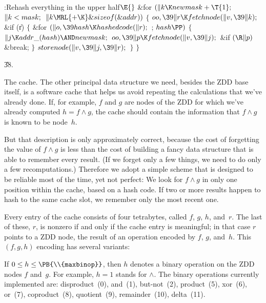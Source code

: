 \Y\B\4:Rehash everything in the upper half\X${}\E{}$\6
\&{for} ${}(\|k\K\\{newmask}+\T{1};{}$ ${}\|k<\\{mask};{}$ ${}\|k\MRL{+{\K}}%
\&{sizeof}(\&{addr})){}$\5
${}\{{}$\1\6
${}\\{oo},\39\|r\K\\{fetchnode}(\|v,\39\|k);{}$\6
\&{if} (\|r)\5
${}\{{}$\1\6
\&{for} ${}(\|o,\39\\{hash}\K\\{hashedcode}(\|r);{}$  ; ${}\\{hash}\PP){}$\5
${}\{{}$\1\6
${}\|j\K\\{addr\_}(\\{hash})\AND\\{newmask};{}$\6
${}\\{oo},\39\|p\K\\{fetchnode}(\|v,\39\|j);{}$\6
\&{if} ${}(\R\|p){}$\1\5
\&{break};\2\6
\4${}\}{}$\2\6
${}\\{storenode}(\|v,\39\|j,\39\|r);{}$\6
\4${}\}{}$\2\6
\4${}\}{}$\2\par
\U38.\fi

The cache. The other principal data structure we need,
besides the ZDD base
itself, is a software cache that helps us avoid repeating the calculations
that we've already done. If, for example, $f$ and $g$ are nodes of the ZDD for
which we've already computed $h=f\land g$, the cache should contain the
information that $f\land g$ is known to be node~$h$.

But that description is only approximately correct, because
the cost of forgetting the value of $f\land g$ is less than the cost of
building a fancy data structure that is able to remember every result.
(If we forget only a few things, we need to do only a few recomputations.)
Therefore we adopt a simple scheme that is designed to be reliable most of
the time, yet not perfect: We look for $f\land g$ in only one position
within the cache, based on a hash code. If two or more results happen
to hash to the same cache slot, we remember only the most recent one.

Every entry of the cache consists of four tetrabytes, called
$f$, $g$, $h$, and~$r$. The last of these, $r$, is nonzero if and only if the
cache entry is meaningful; in that case $r$ points to a ZDD node, the result
of an operation encoded by $f$, $g$, and~$h$.
This $(f,g,h)$ encoding has several variants:

\smallskip\textindent{$\bullet$} If $0\le h\le\PB{\\{maxbinop}}$, then $h$
denotes a binary operation on the ZDD nodes $f$ and~$g$.
For example, $h=1$ stands for $\land$. The binary operations currently
implemented are:
disproduct~(0),
and~(1),
but-not~(2),
product~(5),
xor~(6),
or~(7),
coproduct~(8),
quotient~(9),
remainder~(10),
delta~(11).

